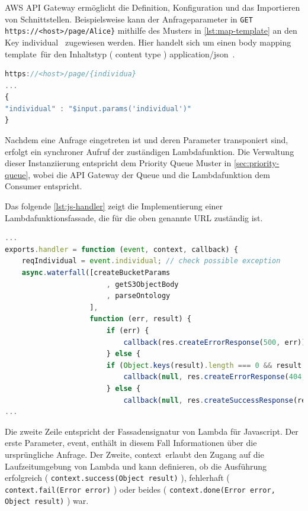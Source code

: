 \documentclass[
12pt,
english,
ngerman,
headsepline,
twoside,
openright,
numbers=noenddot,version=first
]{scrreprt}
\begin{document}
AWS API Gateway ermöglicht die Definition, Konfiguration und das Importieren von Schnittstellen. Beispielsweise kann der Anfrageparameter in \lstinline|GET https://<host>/page/Alice}| mithilfe des Musters in \autoref{lst:map-template} an den Key \glqq individual \grqq\ zugewiesen werden. Hier handelt sich um einen \glqq body mapping template\grqq\ für den Inhaltstyp ( content type ) \glqq application/json\grqq\ .

\begin{lstlisting}[language=Javascript,caption={API Gateway Request Mapping Template},label={lst:map-template}]
https://<host>/page/{individua}
...
{
"individual" : "$input.params('individual')"
}
\end{lstlisting}

Nachdem eine Anfrage eingetreten ist und deren Parameter transponiert sind, erfolgt ein synchroner Aufruf der zuständigen Lambdafunktion. Die Verwaltung dieser Instanziierung entspricht dem Priority Queue Muster in \autoref{sec:priority-queue}, wobei die \acrshort{API} Gateway der Queue und die Lambdafunktion dem Consumer entspricht.

Das folgende \autoref{lst:js-handler} zeigt die Implementierung einer Lambdafunktionsfassade, die für die oben genannte \acrshort{URL} zuständig ist. 

\begin{lstlisting}[language=Javascript,caption={Lambda Javascript Funktionsfassade},label={lst:js-handler}]
...
exports.handler = function (event, context, callback) {
	reqIndividual = event.individual; // check possible exception
	async.waterfall([createBucketParams
						, getS3ObjectBody
						, parseOntology
					],
					function (err, result) {
						if (err) {
							callback(res.createErrorResponse(500, err));
						} else {
						if (Object.keys(result).length === 0 && result.constructor === Object) {
							callback(null, res.createErrorResponse(404, "there was no result on the search"));
						} else {
							callback(null, res.createSuccessResponse(result));
...
\end{lstlisting}

Die zweite Zeile entspricht der Fassadensignatur von Lambda für Javascript. Der erste Parameter, \glqq event\grqq, enthält in diesem Fall Informationen über die ursprüngliche Anfrage. Der Zweite, \glqq context\grqq\, erlaubt den Zugang auf die Laufzeitumgebung von Lambda und kann definieren, ob die Ausführung erfolgreich ( \lstinline|context.success(Object result)| ), fehlerhaft ( \lstinline|context.fail(Error error)| ) oder beides ( \lstinline|context.done(Error error, Object result)| ) war. 
\end{document}
